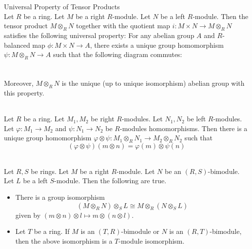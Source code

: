 \documentclass[a4paper]{article}
\begin{document}
\begin{prp}{Universal Property of Tensor Products}{}\\
Let $R$ be a ring. Let $M$ be a right $R$-module. Let $N$ be a left $R$-module. Then the tensor product $M\otimes_RN$ together with the quotient map $i:M\times N\to M\otimes_RN$ satisfies the following universal property: For any abelian group $A$ and $R$-balanced map $\phi:M\times N\to A$, there exists a unique group homomorphism $\psi:M\otimes_RN\to A$ such that the following diagram commutes: \\~\\
\\
Moreover, $M\otimes_RN$ is the unique (up to unique isomorphism) abelian group with this property. 
\end{prp}

\begin{prp}{}{}\\
Let $R$ be a ring. Let $M_1,M_2$ be right $R$-modules. Let $N_1,N_2$ be left $R$-modules. Let $\varphi:M_1\to M_2$ and $\psi:N_1\to N_2$ be $R$-modules homomorphisms. Then there is a unique group homomorphism $\varphi\otimes\psi:M_1\otimes_RN_1\to M_2\otimes_RN_2$ such that $$(\varphi\otimes\psi)(m\otimes n)=\varphi(m)\otimes\psi(n)$$
\end{prp}

\begin{prp}{}{}\\
Let $R,S$ be rings. Let $M$ be a right $R$-module. Let $N$ be an $(R,S)$-bimodule. Let $L$ be a left $S$-module. Then the following are true. 
\begin{itemize}
\item There is a group isomorphism $$(M\otimes_RN)\otimes_SL\cong M\otimes_R(N\otimes_SL)$$ given by $(m\otimes n)\otimes l\mapsto m\otimes(n\otimes l)$. 
\item Let $T$ be a ring. If $M$ is an $(T,R)$-bimodule or $N$ is an $(R,T)$-bimodule, then the above isomorphism is a $T$-module isomorphism. 
\end{itemize}
\end{prp}
\end{document}
